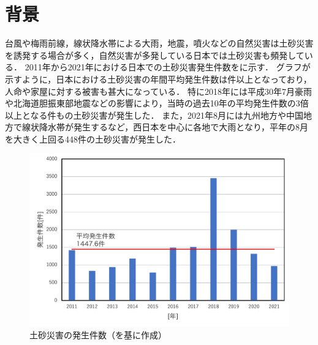 \documentclass[../main]{subfiles}
\begin{document}
\graphicspath{{../figures/chap1/}}

\section{背景}
\label{sec:intro_background}
台風や梅雨前線，線状降水帯による大雨，地震，噴火などの自然災害は土砂災害を誘発する場合が多く，自然災害が多発している日本では土砂災害も頻発している．
2011年から2021年における日本での土砂災害発生件数をに示す．
グラフが示すように，日本における土砂災害の年間平均発生件数は件以上となっており，人命や家屋に対する被害も甚大になっている．
特に2018年には平成30年7月豪雨や北海道胆振東部地震などの影響により，当時の過去10年の平均発生件数の3倍以上となる件もの土砂災害が発生した．
また，2021年8月には九州地方や中国地方で線状降水帯が発生するなど，西日本を中心に各地で大雨となり，平年の8月を大きく上回る448件の土砂災害が発生した．

\vspace{9\zh}
\begin{figure}[h]
    \centering
    \includegraphics[keepaspectratio, width=0.8 \linewidth]{num_year_landslides.pdf}
    \caption{土砂災害の発生件数（\protect {}を基に作成）}
    \label{fig:num_landslides}
\end{figure}
\clearpage
\end{document}
